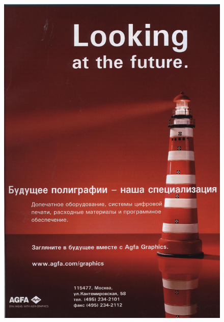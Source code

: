 \documentclass{book}
\begin{document}
\begin{figure}[H]
\begin{center}
\includegraphics[scale=0.2]{images/56.jpg}

\end{center}
\end{figure}
\end{document}
